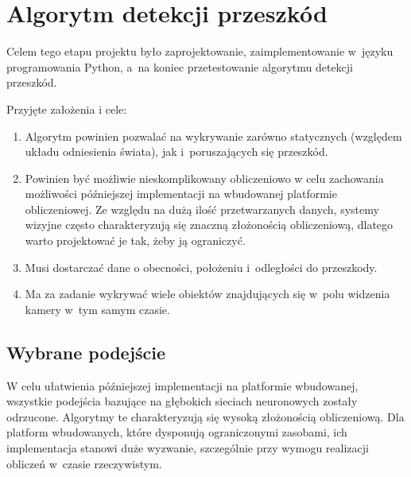 \chapter{Algorytm detekcji przeszkód}
\label{cha:algorytm}



Celem tego etapu projektu było zaprojektowanie, zaimplementowanie w~języku programowania Python, a~na koniec przetestowanie algorytmu detekcji przeszkód.

\vspace{11px}

Przyjęte założenia i cele:
\begin{enumerate}
    \item Algorytm powinien pozwalać na wykrywanie zarówno statycznych (względem układu odniesienia świata), jak i~poruszających się przeszkód.
    \item Powinien być możliwie nieskomplikowany obliczeniowo w celu zachowania możliwości późniejszej implementacji na wbudowanej platformie obliczeniowej. Ze względu na dużą ilość przetwarzanych danych, systemy wizyjne często charakteryzują się znaczną złożonością obliczeniową, dlatego warto projektować je tak, żeby ją ograniczyć.
    \item Musi dostarczać dane o obecności, położeniu i~odległości do przeszkody.
    \item Ma za zadanie wykrywać wiele obiektów znajdujących się w~polu widzenia kamery w~tym samym czasie.
\end{enumerate}

\section{Wybrane podejście}

W celu ułatwienia późniejszej implementacji na platformie wbudowanej, wszystkie podejścia bazujące na głębokich sieciach neuronowych zostały odrzucone. Algorytmy te charakteryzują się wysoką złożonością obliczeniową. Dla platform wbudowanych, które dysponują ograniczonymi zasobami, ich implementacja stanowi duże wyzwanie, szczególnie przy wymogu realizacji obliczeń w~czasie rzeczywistym.


